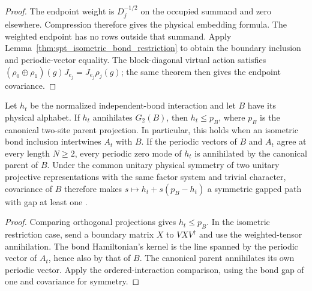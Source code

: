 \begin{proof}\leanok
    The endpoint weight is $D_j^{-1/2}$ on the occupied summand and
    zero elsewhere. Compression therefore gives the physical embedding
    formula. The weighted endpoint has no rows outside that summand.
    Apply Lemma~\ref{thm:spt_isometric_bond_restriction} to obtain the
    boundary inclusion and periodic-vector equality. The block-diagonal
    virtual action satisfies
    $(\rho_0\oplus\rho_1)(g)J_{e_j}=J_{e_j}\rho_j(g)$; the same theorem
    then gives the endpoint covariance.
\end{proof}

\begin{lemma}
    \label{thm:spt_embedded_parent_comparison}
    \leanok
    Let $h_t$ be the normalized independent-bond interaction and let
    $B$ have its physical alphabet. If $h_t$ annihilates $G_2(B)$,
    then $h_t\leq p_B$, where $p_B$ is the canonical two-site parent
    projection. In particular, this holds when an isometric bond
    inclusion intertwines $A_t$ with $B$.
    If the periodic vectors of $B$ and $A_t$ agree at every length
    $N\geq2$, every periodic zero mode of $h_t$ is annihilated by the
    canonical parent of $B$. Under the common unitary physical symmetry
    of two unitary projective representations with the same factor system
    and trivial character, covariance of $B$ therefore makes
    $s\mapsto h_t+s(p_B-h_t)$ a symmetric gapped path with gap at
    least one \cite[Section~II.F.2]{Schuch2011Phases}.
\end{lemma}

\begin{proof}\leanok
    Comparing orthogonal projections gives $h_t\leq p_B$.
    In the isometric restriction case, send a boundary matrix
    $X$ to $VXV^\dagger$ and use the weighted-tensor annihilation.
    The bond Hamiltonian's kernel is the line spanned by the periodic
    vector of $A_t$, hence also by that of $B$. The canonical parent
    annihilates its own periodic vector. Apply the ordered-interaction
    comparison, using the bond gap of one and covariance for symmetry.
\end{proof}

